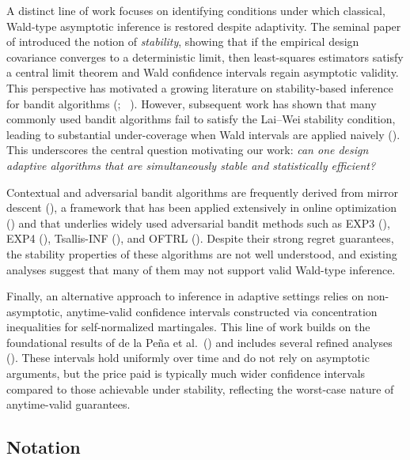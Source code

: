 \documentclass[11pt,letterpaper]{article}
\theoremstyle{plain}
\theoremstyle{definition}  %
\begin{document}
A distinct line of work focuses on identifying conditions under which classical, Wald-type
asymptotic inference is restored despite adaptivity. The seminal paper of
\citet{lai1982least} introduced the notion of \emph{stability}, showing that if the empirical design
covariance converges to a deterministic limit, then least-squares estimators satisfy a central limit
theorem and Wald confidence intervals regain asymptotic validity.  
This perspective has motivated a growing literature on stability-based inference for bandit
algorithms (\citet{kalvit2021closer,khamaru2024inference,fan2022typical,fan2024precise,
han2024ucb,halder2025stable}; \ \citet{fan2025statistical}). However, subsequent work has shown that many commonly used
bandit algorithms fail to satisfy the Lai--Wei stability condition, leading to substantial
under-coverage when Wald intervals are applied naively
(\citet{fan2024precise,praharaj2025instability}).  
This underscores the central question motivating our work: \emph{can one design adaptive
algorithms that are simultaneously stable and statistically efficient?}

Contextual and adversarial bandit algorithms are frequently derived from mirror descent
(\citet{lattimore2020bandit}), a framework that has been applied extensively in online
optimization (\citet{abernethy2009competing,audibert2014regret,bubeck2018sparsity,wei2018more})
and that underlies widely used adversarial bandit methods such as EXP3
(\citet{auer1995gambling}), EXP4 (\citet{auer2002nonstochastic}), Tsallis-INF
(\citet{zimmert2021tsallis,masoudian2021improved}), and OFTRL (\citet{pmlr-v134-ito21a}).
Despite their strong regret guarantees, the stability properties of these algorithms are not well
understood, and existing analyses suggest that many of them may not support valid Wald-type
inference.

Finally, an alternative approach to inference in adaptive settings relies on non-asymptotic,
anytime-valid confidence intervals constructed via concentration inequalities for self-normalized
martingales. This line of work builds on the foundational results of de la Pe\~na et al.\
(\citet{de2004self,de2009self}) and includes several refined analyses
(\citet{abbasi2011improved,howard2020time,waudby2024anytime}).  
These intervals hold uniformly over time and do not rely on asymptotic arguments, but the price
paid is typically much wider confidence intervals compared to those achievable under stability,
reflecting the worst-case nature of anytime-valid guarantees.

\subsection{Notation}
\end{document}
